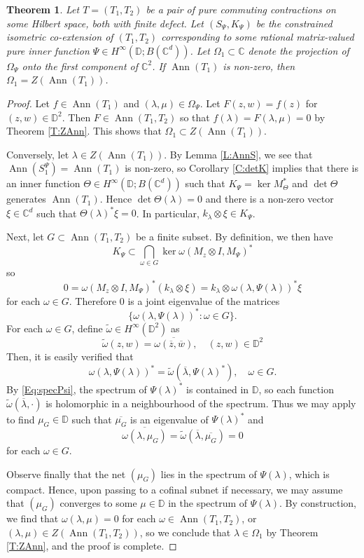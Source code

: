 \documentclass[10pt]{amsart}
\newcommand{\bC}{{\mathbb{C}}}
\newcommand{\bD}{{\mathbb{D}}}
\newcommand{\ol}{\overline}
\newcommand{\Ann}{\operatorname{Ann}}
\newtheorem{theorem}[lemma]{Theorem}
\theoremstyle{definition}
\begin{document}
\begin{theorem}\label{T:ZAnn1}
Let $T=(T_1,T_2)$ be a pair of pure commuting contractions on some Hilbert space, both with finite defect. Let $(S_\Psi,K_\Psi)$ be the constrained isometric co-extension of $(T_1,T_2)$ corresponding to some rational matrix-valued pure inner function $\Psi\in H^\infty(\bD;B(\bC^d))$.  Let $\Omega_1\subset \bC$ denote the projection of $\Omega_\Psi$ onto the first component of $\bC^2$. If $\Ann(T_1)$ is non-zero,  then $\Omega_1=Z(\Ann(T_1))$.
\end{theorem}
\begin{proof}
Let $f\in \Ann(T_1)$ and $(\lambda,\mu)\in \Omega_\Psi$. Let $F(z,w)=f(z)$ for $(z,w)\in \bD^2$. Then $F\in \Ann(T_1,T_2)$ so that $f(\lambda)=F(\lambda,\mu)=0$ by Theorem \ref{T:ZAnn}.  This shows that $\Omega_1\subset Z(\Ann(T_1))$.

Conversely, let $\lambda\in Z(\Ann(T_1))$.  By Lemma \ref{L:AnnS}, we see that $\Ann(S^\Psi_1)=\Ann(T_1)$ is non-zero, so Corollary \ref{C:detK} implies that there is an inner function $\Theta\in H^\infty(\bD;B(\bC^d))$ such that $K_\Psi=\ker M_\Theta^*$ and $\det \Theta$ generates $\Ann(T_1)$. Hence $\det\Theta(\lambda)=0$ and there is a non-zero vector $\xi\in \bC^d$ such that $\Theta(\lambda)^*\xi=0$. In particular, $k_\lambda\otimes \xi\in K_\Psi$. 

Next, let $G\subset \Ann(T_1,T_2)$ be a finite subset. By definition, we then have \[K_\Psi\subset \bigcap_{\omega\in G} \ker \omega(M_z\otimes I, M_\Psi)^*\] so
\[
0=\omega(M_z\otimes I, M_\Psi)^* (k_\lambda \otimes \xi)=k_\lambda\otimes \omega(\lambda, \Psi(\lambda))^*\xi
\]
for each $\omega\in G$.
Therefore   $0$ is a joint eigenvalue of the matrices  $$\{\omega(\lambda,\Psi(\lambda))^*:\omega\in G\}.$$
For each $\omega\in G$, define $\tilde\omega\in H^\infty(\bD^2)$ as
\[
\tilde\omega(z,w)=\ol{\omega(\ol{z},\ol{w})}, \quad (z,w)\in \bD^2
\]
Then, it is easily verified that 
\[
\omega(\lambda,\Psi(\lambda))^*=\tilde \omega(\ol{\lambda},\Psi(\lambda)^*), \quad \omega\in G.
\]
By \eqref{Eq:specPsi}, the spectrum of $\Psi(\lambda)^*$ is contained in $\bD$, so each function $\tilde\omega(\ol{\lambda},\cdot)$ is holomorphic in a neighbourhood of the spectrum. Thus we may apply \cite[Theorem 7.7]{muller2007} to  find $\mu_G\in \bD$ such that $\ol{\mu_G}$ is an eigenvalue of $\Psi(\lambda)^*$ and \[
\ol{\omega(\lambda,\mu_G)}=\tilde \omega(\ol{\lambda},\ol{\mu_G})=0
\]
 for each $\omega\in G$.  

Observe finally that the net $(\mu_G)$ lies in the spectrum of $\Psi(\lambda)$, which is compact. Hence, upon passing to a cofinal subnet if necessary, we may assume that $(\mu_G)$ converges to some $\mu\in \bD$ in the spectrum of $\Psi(\lambda)$. By construction, we find that $\omega(\lambda,\mu)=0$ for each $\omega\in \Ann(T_1,T_2)$, or  $(\lambda,\mu)\in Z(\Ann(T_1,T_2))$, so we conclude that $\lambda\in \Omega_1$ by Theorem \ref{T:ZAnn}, and the proof is complete.
\end{proof}
\end{document}

